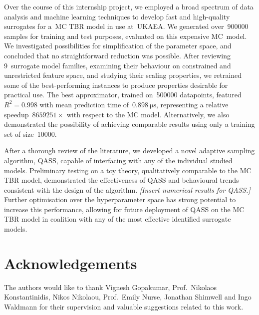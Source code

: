 Over the course of this internship project, we employed a broad spectrum of data
analysis and machine learning techniques to develop fast and high-quality
surrogates for a~MC TBR model in use at~UKAEA. We generated over~\num{900000}
samples for training and test purposes, evaluated on this expensive MC~model. We
investigated possibilities for simplification of the parameter space, and
concluded that no straightforward reduction was possible. After reviewing
9~surrogate model families, examining their behaviour on constrained and
unrestricted feature space, and studying their scaling properties, we retrained
some of the best-performing instances to produce properties desirable for
practical use. The best approximator, trained on~\num{500000} datapoints,
featured~$R^2=\num{0.998}$ with mean prediction time
of~$\SI{0.898}{\micro\second}$, representing a relative
speedup~$\num{8659251} \times$ with respect to the MC model. Alternatively, we
also demonstrated the possibility of achieving comparable results using only a
training set of size~\num{10000}.

After a thorough review of the literature, we developed a novel adaptive
sampling algorithm, QASS, capable of interfacing with any of the individual
studied models. Preliminary testing on a toy theory, qualitatively comparable to
the MC TBR model, demonstrated the effectiveness of QASS and behavioural trends
consistent with the design of the algorithm. \textit{[Insert numerical results
for QASS.]} Further optimisation over the hyperparameter space has strong
potential to increase this performance, allowing for future deployment of QASS
on the MC TBR model in coalition with any of the most effective identified
surrogate models.


\section*{Acknowledgements}

The authors would like to thank Vignesh Gopakumar, Prof.~Nikolaos
Konstantinidis, Nikos Nikolaou, Prof.~Emily Nurse, Jonathan Shimwell and Ingo
Waldmann for their supervision and valuable suggestions related to this work.

